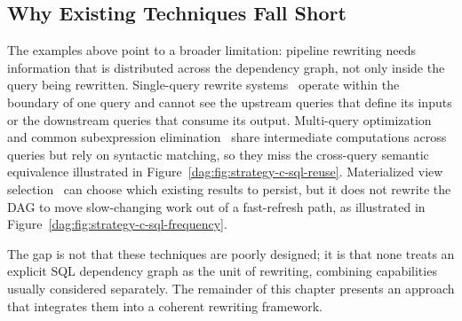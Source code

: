\subsection{Why Existing Techniques Fall Short}
\label{dag:sec:why-different}


The examples above point to a broader limitation: pipeline rewriting needs information that is distributed across the dependency graph, not only inside the query being rewritten.
Single-query rewrite systems~\cite{wetune,sun2024r} operate within the boundary of one query and cannot see the upstream queries that define its inputs or the downstream queries that consume its output.
Multi-query optimization and common subexpression elimination~\cite{sellis1988multiple} share intermediate computations across queries but rely on syntactic matching, so they miss the cross-query semantic equivalence illustrated in Figure~\ref{dag:fig:strategy-c-sql-reuse}.
Materialized view selection~\cite{agrawal2000automated} can choose which existing results to persist, but it does not rewrite the DAG to move slow-changing work out of a fast-refresh path, as illustrated in Figure~\ref{dag:fig:strategy-c-sql-frequency}.


The gap is not that these techniques are poorly designed; it is that none treats an explicit SQL dependency graph as the unit of rewriting, combining capabilities usually considered separately. The remainder of this chapter presents an approach that integrates them into a coherent rewriting framework.






